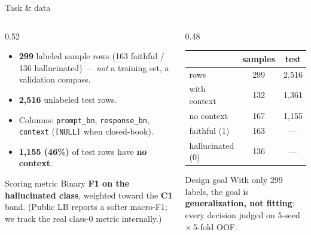 \documentclass[aspectratio=169,11pt,t]{beamer}
\newcommand{\metric}[1]{{\color{primary}\bfseries #1}}
\begin{document}
\begin{frame}{Task \& data}
  \begin{columns}[T]
    \begin{column}{0.52\textwidth}
      \begin{itemize}
        \item \metric{299} labeled sample rows (163 faithful / 136 hallucinated) — \emph{not} a training set, a validation compass.
        \item \metric{2{,}516} unlabeled test rows.
        \item Columns: \texttt{prompt\_bn}, \texttt{response\_bn}, \texttt{context} (\texttt{[NULL]} when closed-book).
        \item \metric{1{,}155 (46\%)} of test rows have \textbf{no context}.
      \end{itemize}
      \vspace{0.15em}
      \begin{block}{Scoring metric}
        \footnotesize Binary \metric{F1 on the hallucinated class}, weighted toward the \metric{C1} band. (Public LB reports a softer macro-F1; we track the real class-0 metric internally.)
      \end{block}
    \end{column}
    \begin{column}{0.48\textwidth}
      \centering
      \small
      \begin{tabular}{lcc}
        \toprule
        & \bfseries samples & \bfseries test \\
        \midrule
        rows            & 299   & 2{,}516 \\
        with context    & 132   & 1{,}361 \\
        no context      & 167   & 1{,}155 \\
        faithful (1)    & 163   & --- \\
        hallucinated (0)& 136   & --- \\
        \bottomrule
      \end{tabular}
      \vspace{0.6em}
      \begin{block}{Design goal}
        \footnotesize With only 299 labels, the goal is \textbf{generalization, not fitting}: every decision judged on 5-seed\,$\times$\,5-fold OOF.
      \end{block}
    \end{column}
  \end{columns}
\end{frame}
\end{document}
